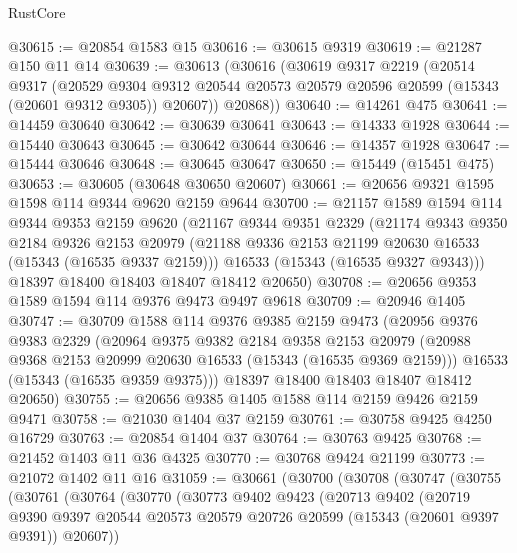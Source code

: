 \begin{lexlean}{RustCore}
\begin{coremodule}
@30615 := @20854 @1583 @15
@30616 := @30615 @9319
@30619 := @21287 @150 @11 @14
@30639 := @30613
    (@30616
      (@30619
        @9317
        @2219
        (@20514
          @9317
          (@20529
            @9304
            @9312
            @20544
            @20573
            @20579
            @20596
            @20599
            (@15343 (@20601 @9312 @9305))
            @20607))
        @20868))
@30640 := @14261 @475
@30641 := @14459 @30640
@30642 := @30639 @30641
@30643 := @14333 @1928
@30644 := @15440 @30643
@30645 := @30642 @30644
@30646 := @14357 @1928
@30647 := @15444 @30646
@30648 := @30645 @30647
@30650 := @15449 (@15451 @475)
@30653 := @30605 (@30648 @30650 @20607)
@30661 := @20656 @9321 @1595 @1598 @114 @9344 @9620 @2159 @9644
@30700 := @21157
    @1589
    @1594
    @114
    @9344
    @9353
    @2159
    @9620
    (@21167
      @9344
      @9351
      @2329
      (@21174
        @9343
        @9350
        @2184
        @9326
        @2153
        @20979
        (@21188 @9336 @2153 @21199 @20630 @16533 (@15343 (@16535 @9337 @2159)))
        @16533
        (@15343 (@16535 @9327 @9343)))
      @18397
      @18400
      @18403
      @18407
      @18412
      @20650)
@30708 := @20656 @9353 @1589 @1594 @114 @9376 @9473 @9497 @9618
@30709 := @20946 @1405
@30747 := @30709
    @1588
    @114
    @9376
    @9385
    @2159
    @9473
    (@20956
      @9376
      @9383
      @2329
      (@20964
        @9375
        @9382
        @2184
        @9358
        @2153
        @20979
        (@20988 @9368 @2153 @20999 @20630 @16533 (@15343 (@16535 @9369 @2159)))
        @16533
        (@15343 (@16535 @9359 @9375)))
      @18397
      @18400
      @18403
      @18407
      @18412
      @20650)
@30755 := @20656 @9385 @1405 @1588 @114 @2159 @9426 @2159 @9471
@30758 := @21030 @1404 @37 @2159
@30761 := @30758 @9425 @4250 @16729
@30763 := @20854 @1404 @37
@30764 := @30763 @9425
@30768 := @21452 @1403 @11 @36 @4325
@30770 := @30768 @9424 @21199
@30773 := @21072 @1402 @11 @16
@31059 := @30661
    (@30700
      (@30708
        (@30747
          (@30755
            (@30761
              (@30764
                (@30770
                  (@30773
                    @9402
                    @9423
                    (@20713
                      @9402
                      (@20719
                        @9390
                        @9397
                        @20544
                        @20573
                        @20579
                        @20726
                        @20599
                        (@15343 (@20601 @9397 @9391))
                        @20607))

\end{coremodule}
\end{lexlean}
